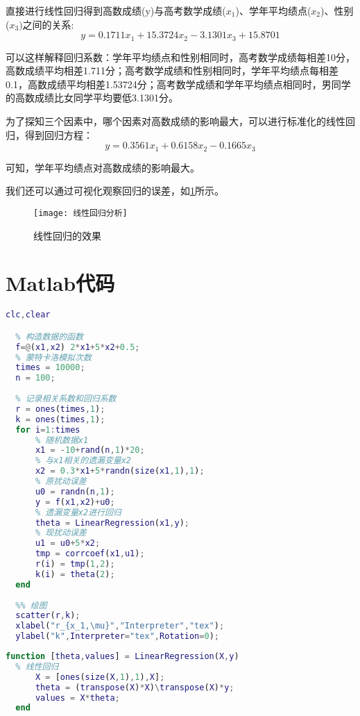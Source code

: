 \documentclass[withoutpreface]{cumcmthesis}
\begin{document}
直接进行线性回归得到高数成绩(y)与高考数学成绩($x_1$)、学年平均绩点($x_2$)、性别($x_3)$之间的关系:
\begin{equation}
  y = 0.1711 x_1 +  15.3724 x_2  -3.1301 x_3 + 15.8701
\end{equation}

可以这样解释回归系数：学年平均绩点和性别相同时，高考数学成绩每相差10分，高数成绩平均相差1.711分；高考数学成绩和性别相同时，学年平均绩点每相差0.1，高数成绩平均相差1.53724分；高考数学成绩和学年平均绩点相同时，男同学的高数成绩比女同学平均要低3.1301分。

为了探知三个因素中，哪个因素对高数成绩的影响最大，可以进行标准化的线性回归，得到回归方程：
\begin{equation}
  y = 0.3561 x_1 +  0.6158 x_2  -0.1665 x_3
\end{equation}

可知，学年平均绩点对高数成绩的影响最大。

我们还可以通过可视化观察回归的误差，如\cref{Fig:2}所示。
\begin{figure}[H]
  \centering
  \texttt{[image: 线性回归分析]}
  \caption{线性回归的效果}\label{Fig:2}
\end{figure}

\appendix
\section{Matlab代码}
  \begin{lstlisting}[language=matlab,caption={蒙特卡洛模拟}]
  clc,clear

  % 构造数据的函数
  f=@(x1,x2) 2*x1+5*x2+0.5;
  % 蒙特卡洛模拟次数
  times = 10000;
  n = 100;
  
  % 记录相关系数和回归系数
  r = ones(times,1);
  k = ones(times,1);
  for i=1:times
      % 随机数据x1
      x1 = -10+rand(n,1)*20;
      % 与x1相关的遗漏变量x2
      x2 = 0.3*x1+5*randn(size(x1,1),1);
      % 原扰动误差
      u0 = randn(n,1);
      y = f(x1,x2)+u0;
      % 遗漏变量x2进行回归
      theta = LinearRegression(x1,y);
      % 现扰动误差
      u1 = u0+5*x2;
      tmp = corrcoef(x1,u1);
      r(i) = tmp(1,2);
      k(i) = theta(2);
  end
  
  %% 绘图
  scatter(r,k);
  xlabel("r_{x_1,\mu}","Interpreter","tex");
  ylabel("k",Interpreter="tex",Rotation=0);
  \end{lstlisting}

  \begin{lstlisting}[language=matlab ,caption={自定义的线性回归函数} ]
  function [theta,values] = LinearRegression(X,y)
  % 线性回归
      X = [ones(size(X,1),1),X];
      theta = (transpose(X)*X)\transpose(X)*y;
      values = X*theta;
  end
  \end{lstlisting}
\end{document}
